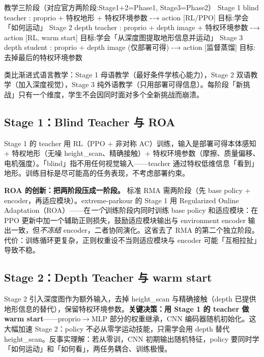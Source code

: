 \begin{codebox}[text]{教学三阶段（对应官方两阶段:Stage1+2=Phase1, Stage3=Phase2）}
Stage 1  blind teacher : proprio + 特权地形 + 特权环境参数 -→ action   [RL/PPO]
                         目标:学会「如何运动」
Stage 2  depth teacher : proprio + depth image + 特权环境参数 -→ action [RL, warm start]
                         目标:学会「从深度图提取地形信息并运动」
Stage 3  depth student : proprio + depth image (仅部署可得) -→ action   [监督蒸馏]
                         目标:去掉最后的特权环境参数
\end{codebox}

类比渐进式语言教学：Stage 1 母语教学（最好条件学核心能力），Stage 2 双语教学（加入深度视觉），Stage 3 纯外语教学（只用部署可得信息）。每阶段「新挑战」只有一个维度，学生不会因同时面对多个全新挑战而崩溃。

\subsection{Stage 1：Blind Teacher 与 ROA}
\label{sec:rlmc-priv-stage1}

Stage 1 的 teacher 用 RL（PPO + 非对称 AC）训练，输入是部署可得本体感知 + 特权地形（无噪 height\_scan、精确接触）+ 特权环境参数（摩擦、质量偏移、电机强度）。「blind」指不用任何视觉输入——teacher 通过特权低维信息「看到」地形。训练目标是尽可能高的任务表现，不考虑部署约束。

\textbf{ROA 的创新：把两阶段压成一阶段。} 标准 RMA 需两阶段（先 base policy + encoder，再适应模块）。extreme-parkour 的 Stage 1 用 Regularized Online Adaptation（ROA）——在\emph{一个}训练阶段内同时训练 base policy 和适应模块：在 PPO 更新中加一个辅助正则损失，鼓励适应模块输出与 environment encoder 输出一致，但\emph{不冻结} encoder，二者协同演化。这省去了 RMA 的第二个独立阶段。代价：训练循环更复杂，正则权重设不当则适应模块与 encoder 可能「互相拉扯」导致不稳。

\subsection{Stage 2：Depth Teacher 与 warm start}
\label{sec:rlmc-priv-stage2}

Stage 2 引入深度图作为额外输入，去掉 height\_scan 与精确接触（depth 已提供地形信息的替代），保留特权环境参数。\textbf{关键决策：用 Stage 1 的 teacher 做 warm start}——proprio$\to$MLP 部分的权重继承，CNN 编码器随机初始化。这大幅加速 Stage 2：policy 不必从零学运动技能，只需学会用 depth 替代 height\_scan。反事实理解：若从零训，CNN 初期输出随机特征，policy 要同时学「如何运动」和「如何看」，两任务耦合、训练极慢。

